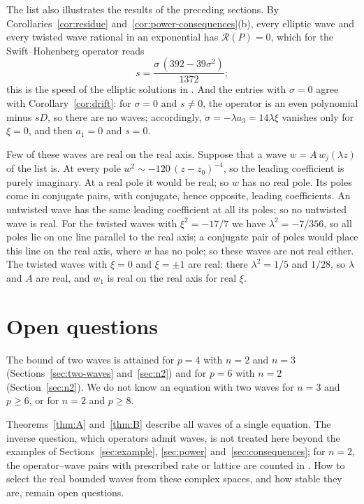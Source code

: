 \documentclass[11pt]{article}
\theoremstyle{definition}
\theoremstyle{remark}
\numberwithin{equation}{section}
\begin{document}
The list also illustrates the results of the preceding sections. By
Corollaries~\ref{cor:residue} and~\ref{cor:power-consequences}(b), every
elliptic wave and every twisted wave rational in an exponential has
\(\mathcal R(P)=0\), which for the Swift--Hohenberg operator reads
\[
 s=\frac{\sigma\,(392-39\sigma^2)}{1372};
\]
this is the speed of the elliptic solutions in
\citep{KudryashovSinelshchikov2012SH}. And the entries with
\(\sigma=0\) agree with Corollary~\ref{cor:drift}: for \(\sigma=0\) and
\(s\ne0\), the operator is an even polynomial minus \(sD\), so there
are no waves; accordingly, \(\sigma=-\lambda a_3=14\lambda\xi\) vanishes
only for \(\xi=0\), and then \(a_1=0\) and \(s=0\).

Few of these waves are real on the real axis. Suppose that a wave
\(w=A\,w_j(\lambda z)\) of the list is. At every pole \(w^2\sim-120\,(z-z_0)^{-4}\), so the leading coefficient is
purely imaginary. At a real pole it would be real; so \(w\) has no real
pole. Its poles come in conjugate pairs, with conjugate, hence
opposite, leading coefficients. An untwisted wave has the same leading
coefficient at all its poles; so no untwisted wave is real. For the
twisted waves with \(\xi^2=-17/7\) we have \(\lambda^2=-7/356\), so all
poles lie on one line parallel to the real axis; a conjugate pair of
poles would place this line on the real axis, where \(w\) has no pole;
so these waves are not real either. The twisted waves with \(\xi=0\) and \(\xi=\pm1\) are
real: there \(\lambda^2=1/5\) and \(1/28\), so \(\lambda\) and \(A\)
are real, and \(w_1\) is real on the real axis for real \(\xi\).

\section{Open questions}\label{sec:scope}

The bound of two waves is attained for \(p=4\) with \(n=2\) and \(n=3\)
(Sections~\ref{sec:two-waves} and~\ref{sec:n2}) and for \(p=6\) with
\(n=2\) (Section~\ref{sec:n2}). We do not know an equation with two
waves for \(n=3\) and \(p\ge6\), or for \(n=2\) and \(p\ge8\).

Theorems~\ref{thm:A} and~\ref{thm:B} describe all waves of a single
equation. The inverse question, which operators admit waves, is not
treated here beyond the examples of Sections~\ref{sec:example},
\ref{sec:power} and~\ref{sec:consequences}; for \(n=2\), the
operator--wave pairs with prescribed rate or lattice are counted in
\citep{MigitaBinomialCount2026}. How to select the real bounded waves
from these complex spaces, and how stable they are, remain open
questions.
\end{document}
